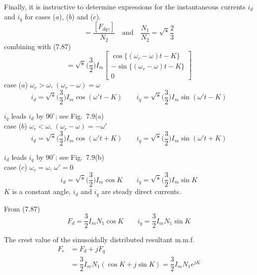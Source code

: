 \documentclass[a4paper,numbers=noenddot,12pt]{scrbook}
\begin{document}
    Finally, it is instructive to determine expressions for the instantaneous currents $i_d$ and $i_q$ for cases ($a$), ($b$) and ($c$).
    \begin{equation*}
        [i_{d q \gamma}] = \dfrac{[F_{d q \gamma}]}{N_2} \quad \text{and} \quad \dfrac{N_1}{N_2} = \sqrt*{\dfrac{2}{3}}
    \end{equation*}
    combining with (7.87)
    \begin{equation}
        [i_{d q \gamma}] = \sqrt*{\Big( \dfrac{3}{2} \Big)} I_m
        \begin{bmatrix}
            \cos \{(\omega_r - \omega)t -K\} \\
            -\sin \{(\omega_r - \omega)t -K\} \\
            0
        \end{bmatrix}
        \label{eq:Eq7.93}
    \end{equation}
    case ($a$) $\omega_r > \omega$, $(\omega_r - \omega) = \omega$
    \begin{equation*}
        i_d = \sqrt*{\Big( \dfrac{3}{2} \Big)} I_m \cos (\omega' t - K) \qquad i_q = \sqrt*{\Big( \dfrac{3}{2} \Big)} I_m \sin (\omega' t - K)
    \end{equation*}

    $i_q$ leads $i_d$ by $90^{\circ}$; see Fig.\ 7.9(a) \\
    case ($b$) $\omega_r < \omega$, $(\omega_r - \omega) = -\omega'$
    \begin{equation*}
        i_d = \sqrt*{\Big( \dfrac{3}{2} \Big)} I_m \cos (\omega' t + K) \qquad i_q = \sqrt*{\Big( \dfrac{3}{2} \Big)} I_m \sin (\omega' t + K)
    \end{equation*}

    $i_d$ leads $i_q$ by $90^{\circ}$; see Fig.\ 7.9(b) \\
    case ($c$) $\omega_r = \omega$, $\omega' = 0$
    \begin{equation*}
        i_d = \sqrt*{\Big( \dfrac{3}{2} \Big)} I_m \cos K \qquad i_q = \sqrt*{\Big( \dfrac{3}{2} \Big)} I_m \sin K
    \end{equation*}
    $K$ is a constant angle, $i_d$ and $i_q$ are steady direct currents.

    From (7.87)
    \begin{equation*}
        F_d = \dfrac{3}{2} I_m N_1 \cos K \qquad i_q = \dfrac{3}{2} I_m N_1 \sin K
    \end{equation*}

    The crest value of the sinusoidally distributed resultant m.m.f.
    \begin{align*}
        F_r & = F_d + jF_q\\
        & = \dfrac{3}{2} I_m N_1 (\cos K + j \sin K) = \dfrac{3}{2} I_m N_1 e^{jK}
    \end{align*}
\end{document}
